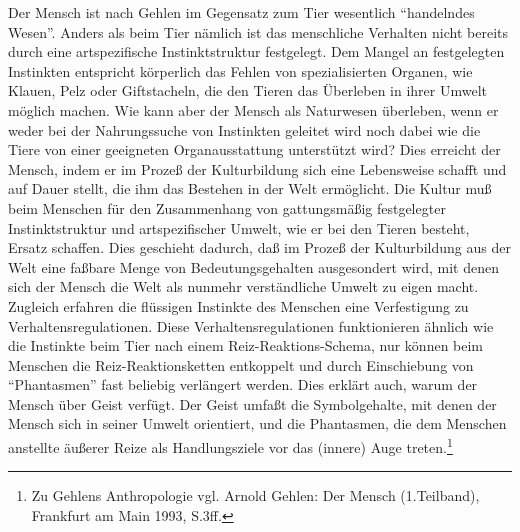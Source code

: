 \documentclass[12pt,a4paper]{article}
\begin{document}
Der Mensch ist nach Gehlen im Gegensatz zum Tier wesentlich "`handelndes
Wesen"'. Anders als beim Tier nämlich ist das menschliche Verhalten
nicht bereits durch eine artspezifische Instinktstruktur festgelegt. Dem
Mangel an festgelegten Instinkten entspricht körperlich das Fehlen von
spezialisierten Organen, wie Klauen, Pelz oder Giftstacheln, die den
Tieren das Überleben in ihrer Umwelt möglich machen. Wie kann aber der
Mensch als Naturwesen überleben, wenn er weder bei der Nahrungssuche von
Instinkten geleitet wird noch dabei wie die Tiere von einer geeigneten
Organausstattung unterstützt wird? Dies erreicht der Mensch, indem er im
Prozeß der Kulturbildung sich eine Lebensweise schafft und auf Dauer
stellt, die ihm das Bestehen in der Welt ermöglicht. Die Kultur muß beim
Menschen für den Zusammenhang von gattungsmäßig festgelegter
Instinktstruktur und artspezifischer Umwelt, wie er bei den Tieren
besteht, Ersatz schaffen. Dies geschieht dadurch, daß im Prozeß der
Kulturbildung aus der Welt eine faßbare Menge von Bedeutungsgehalten
ausgesondert wird, mit denen sich der Mensch die Welt als nunmehr
verständliche Umwelt zu eigen macht. Zugleich erfahren die flüssigen
Instinkte des Menschen eine Verfestigung zu Verhaltensregulationen.
Diese Verhaltensregulationen funktionieren ähnlich wie die Instinkte
beim Tier nach einem Reiz-Reaktions-Schema, nur können beim Menschen die
Reiz-Reaktionsketten entkoppelt und durch Einschiebung von
"`Phantasmen"' fast beliebig verlängert werden. Dies erklärt auch, warum
der Mensch über Geist verfügt. Der Geist umfaßt die Symbolgehalte, mit
denen der Mensch sich in seiner Umwelt orientiert, und die Phantasmen,
die dem Menschen anstellte äußerer Reize als Handlungsziele vor das
(innere) Auge treten.\footnote{Zu Gehlens Anthropologie vgl. Arnold
  Gehlen: Der Mensch (1.Teilband), Frankfurt am Main 1993, S.3ff.}
\end{document}
